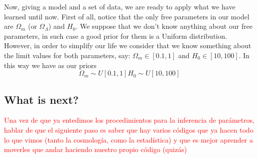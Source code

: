 \documentclass[onecolumn,           %
               showpacs,            %
               preprintnumbers,     %
               aps,                 %
               prl,          	    %
               letterpaper,             %
               superscriptaddress,      %
               nofootinbib,         %
               tightenlines,        %
               floats,floatfix      %
               ,usenatbib,
               ]{revtex4-1}
\begin{document}
Now, giving a model and a set of data, we are ready to apply what we have learned until now. First of all, notice that the only free parameters in our model are $\Omega_m$ (or $\Omega_\Lambda$) and $H_0$. We suppose that we don't know anything about our free parameters, in such case a good prior for them is a Uniform distribution. However, in order to simplify our life we consider that we know something about the limit values for both parameters,  say: $\Omega_m\in [0.1,1]$ and $H_0\in [10,100]$. In this way we have as our priors
\begin{subequations}
\begin{equation}
\Omega_m\sim U[0.1,1]
\end{equation}
\begin{equation}
H_0\sim U[10,100]
\end{equation}
\end{subequations} 
\subsection{What is next?}

\textcolor{red}{Una vez de que ya entedimos los procedimientos para la inferencia de par\'ametros, hablar de que el siguiente paso es saber que hay varios c\'odigos que ya hacen todo lo que vimos (tanto la cosmolog\'ia, como la estad\'istica) y que es mejor aprender a moverles que andar haciendo nuestro propio código (quiz\'as)}



\end{document}
